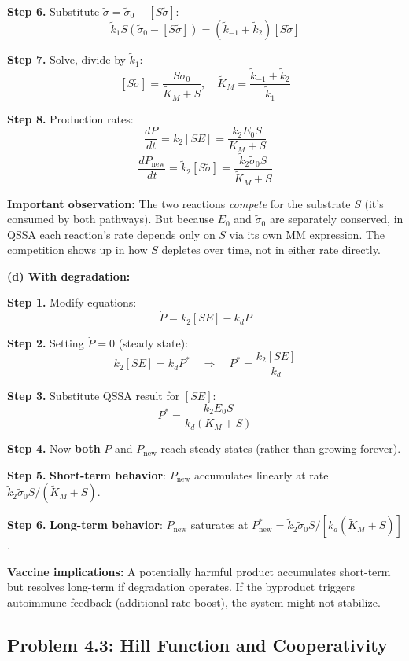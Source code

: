 \documentclass[10pt]{article}
\newcommand{\thus}{\quad\Longrightarrow\quad}
\begin{document}
\begin{solution}
\textbf{Step 6.} Substitute $\tilde\sigma = \tilde\sigma_0 - [S\tilde\sigma]$:
\[
\tilde k_1 S(\tilde\sigma_0 - [S\tilde\sigma]) = (\tilde k_{-1}+\tilde k_2)[S\tilde\sigma]
\]

\textbf{Step 7.} Solve, divide by $\tilde k_1$:
\[
[S\tilde\sigma] = \frac{S\tilde\sigma_0}{\tilde K_M + S}, \quad \tilde K_M = \frac{\tilde k_{-1}+\tilde k_2}{\tilde k_1}
\]

\textbf{Step 8.} Production rates:
\[
\frac{dP}{dt} = k_2[SE] = \frac{k_2 E_0 S}{K_M + S}
\]
\[
\frac{dP_{\text{new}}}{dt} = \tilde k_2[S\tilde\sigma] = \frac{\tilde k_2\tilde\sigma_0 S}{\tilde K_M + S}
\]

\textbf{Important observation:} The two reactions \emph{compete} for the substrate $S$ (it's consumed by both pathways). But because $E_0$ and $\tilde\sigma_0$ are separately conserved, in QSSA each reaction's rate depends only on $S$ via its own MM expression. The competition shows up in how $S$ depletes over time, not in either rate directly.

\medskip\textbf{(d) With degradation:}

\textbf{Step 1.} Modify equations:
\[
\dot P = k_2[SE] - k_d P
\]

\textbf{Step 2.} Setting $\dot P = 0$ (steady state):
\[
k_2[SE] = k_d P^* \thus P^* = \frac{k_2[SE]}{k_d}
\]

\textbf{Step 3.} Substitute QSSA result for $[SE]$:
\[
P^* = \frac{k_2 E_0 S}{k_d(K_M + S)}
\]

\textbf{Step 4.} Now \textbf{both} $P$ and $P_{\text{new}}$ reach steady states (rather than growing forever).

\textbf{Step 5.} \textbf{Short-term behavior}: $P_{\text{new}}$ accumulates linearly at rate $\tilde k_2\tilde\sigma_0 S/(\tilde K_M + S)$.

\textbf{Step 6.} \textbf{Long-term behavior}: $P_{\text{new}}$ saturates at $P_{\text{new}}^* = \tilde k_2\tilde\sigma_0 S/[k_d(\tilde K_M + S)]$.

\textbf{Vaccine implications:} A potentially harmful product accumulates short-term but resolves long-term if degradation operates. If the byproduct triggers autoimmune feedback (additional rate boost), the system might not stabilize.
\end{solution}

\subsection{Problem 4.3: Hill Function and Cooperativity}
\end{document}
